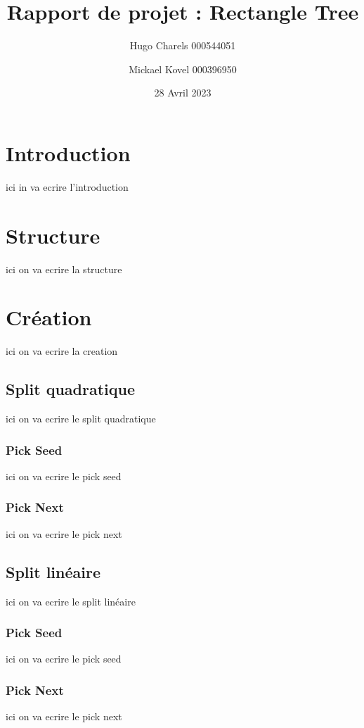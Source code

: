 \documentclass {article}
\begin{document}
\author {Hugo Charels 000544051 \and Mickael Kovel 000396950}
\date {28 Avril 2023}
\title {Rapport de projet : Rectangle Tree}
\maketitle
\newpage


\tableofcontents
\newpage
\section {Introduction}
ici in va ecrire l'introduction

\section {Structure}
ici on va ecrire la structure
\section {Création}
ici on va ecrire la creation
\subsection {Split quadratique}
ici on va ecrire le split quadratique

\subsubsection {Pick Seed}
ici on va ecrire le pick seed

\subsubsection {Pick Next}
ici on va ecrire le pick next

\subsection {Split linéaire}
ici on va ecrire le split linéaire

\subsubsection {Pick Seed}
ici on va ecrire le pick seed

\subsubsection {Pick Next}
ici on va ecrire le pick next
\end{document}
